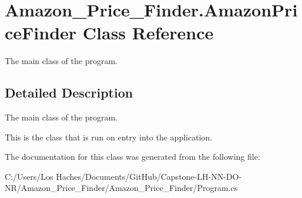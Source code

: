 \hypertarget{class_amazon___price___finder_1_1_amazon_price_finder}{\section{Amazon\-\_\-\-Price\-\_\-\-Finder.\-Amazon\-Price\-Finder Class Reference}
\label{class_amazon___price___finder_1_1_amazon_price_finder}
}


The main class of the program.  




\subsection{Detailed Description}
The main class of the program. 

This is the class that is run on entry into the application. 

The documentation for this class was generated from the following file\-:\begin{DoxyCompactItemize}
\item 
C\-:/\-Users/\-Los Haches/\-Documents/\-Git\-Hub/\-Capstone-\/\-L\-H-\/\-N\-N-\/\-D\-O-\/\-N\-R/\-Amazon\-\_\-\-Price\-\_\-\-Finder/\-Amazon\-\_\-\-Price\-\_\-\-Finder/Program.\-cs\end{DoxyCompactItemize}

